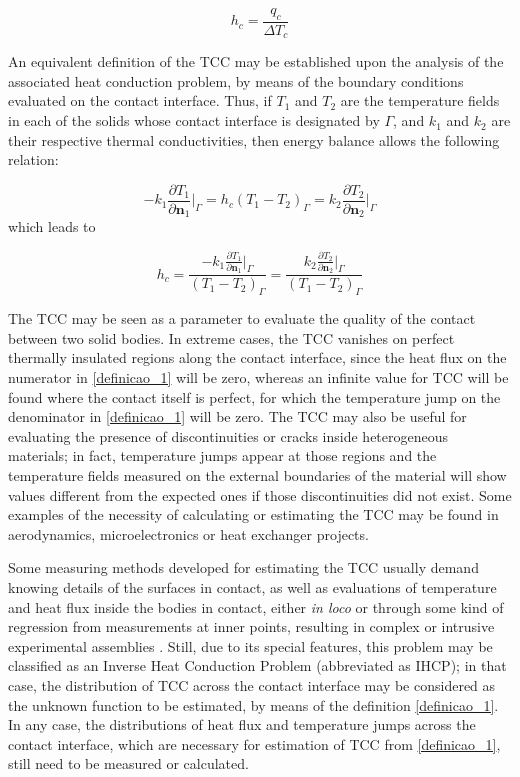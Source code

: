 \documentclass[conference,compsoc,fleqn]{IEEEtran}
\begin{document}
\begin{equation}
h_c = \frac{q_c}{\Delta T_c} \label{definicao_1}
\end{equation}

An equivalent definition of the TCC may be established upon the analysis of the associated heat conduction problem, by means of the boundary conditions evaluated on the contact interface. Thus, if $T_1$ and $T_2$ are the temperature fields in each of the solids whose contact interface is designated by $\Gamma$, and  $k_1$ and $k_2$ are their respective thermal conductivities, then energy balance allows the following relation:

\begin{equation}
-k_1\frac{\partial T_1}{\partial \mathbf{n}_1}\bigg|_\Gamma
=
h_c(T_1 - T_2)_\Gamma
=
k_2\frac{\partial T_2}{\partial \mathbf{n}_2}\bigg|_\Gamma \label{definicao_2}
\end{equation}
which leads to

\begin{equation}
h_c = \frac{-k_1\displaystyle\frac{\partial T_1}{\partial \mathbf{n}_1}\bigg|_\Gamma}{(T_1 - T_2)_\Gamma} = \frac{k_2\displaystyle\frac{\partial T_2}{\partial \mathbf{n}_2}\bigg|_\Gamma}{(T_1 - T_2)_\Gamma} \label{definicao_3}
\end{equation}

The TCC may be seen as a parameter to evaluate the quality of the contact between two solid bodies. In extreme cases, the TCC vanishes on perfect thermally insulated regions along the contact interface, since the heat flux on the numerator in \eqref{definicao_1} will be zero, whereas an infinite value for TCC will be found where the contact itself is perfect, for which the temperature jump on the denominator in \eqref{definicao_1} will be zero. The TCC may also be useful for evaluating the presence of discontinuities or cracks inside heterogeneous materials; in fact, temperature jumps appear at those regions and the temperature fields measured on the external boundaries of the material will show values different from the expected ones if those discontinuities did not exist. Some examples of the necessity of calculating or estimating the TCC may be found in aerodynamics\cite{artigo_aerospacial}, microelectronics\cite{artigo_snaith} or heat exchanger projects\cite{artigo_huang}. 

Some measuring methods developed for estimating the TCC usually demand knowing details of the surfaces in contact, as well as evaluations of temperature and heat flux inside the bodies in contact, either \textit{in loco} or through some kind of regression from measurements at inner points, resulting in complex or intrusive experimental assemblies \cite{artigo_fenech, tese_mikic, artigo_beck, artigo_salgon}. Still, due to its special features, this problem may be classified as an Inverse Heat Conduction Problem (abbreviated as IHCP); in that case, the distribution of TCC across the contact interface may be considered as the unknown function to be estimated, by means of the definition \eqref{definicao_1}. In any case, the distributions of heat flux and temperature jumps across the contact interface, which are necessary for estimation of TCC from \eqref{definicao_1}, still need to be measured or calculated.
\end{document}
